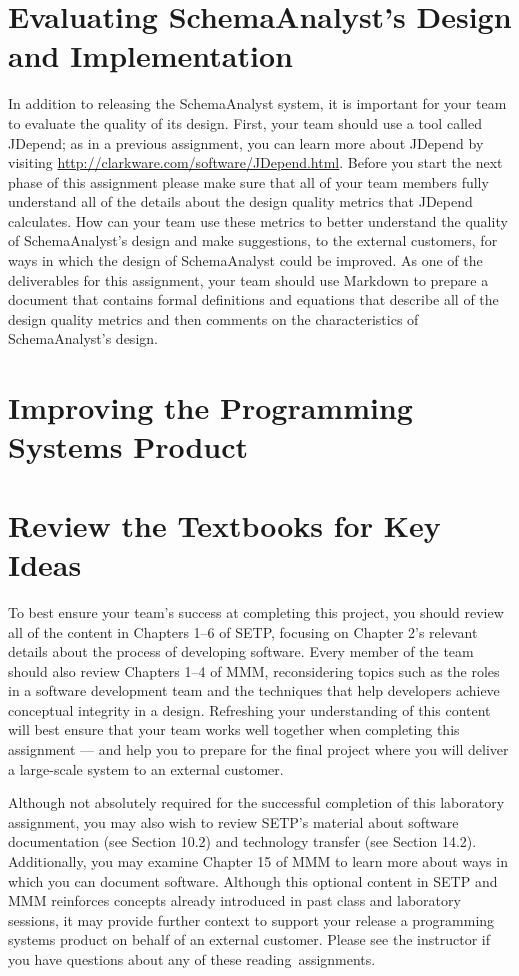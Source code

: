 \section*{Evaluating SchemaAnalyst's Design and Implementation}

In addition to releasing the SchemaAnalyst system, it is important for your team to evaluate the quality of its design.
First, your team should use a tool called JDepend; as in a previous assignment, you can learn more about JDepend by
visiting \url{http://clarkware.com/software/JDepend.html}.  Before you start the next phase of this assignment please
make sure that all of your team members fully understand all of the details about the design quality metrics that
JDepend calculates.  How can your team use these metrics to better understand the quality of SchemaAnalyst's design and
make suggestions, to the external customers, for ways in which the design of SchemaAnalyst could be improved. As one of
the deliverables for this assignment, your team should use Markdown to prepare a document that contains formal
definitions and equations that describe all of the design quality metrics and then comments on the characteristics of
SchemaAnalyst's design.



\section*{Improving the Programming Systems Product}

\section*{Review the Textbooks for Key Ideas}

To best ensure your team's success at completing this project, you should review all of the content in Chapters 1--6 of
SETP, focusing on Chapter 2's relevant details about the process of developing software. Every member of the team should
also review Chapters 1--4 of MMM, reconsidering topics such as the roles in a software development team and the
techniques that help developers achieve conceptual integrity in a design. Refreshing your understanding of this content
will best ensure that your team works well together when completing this assignment --- and help you to prepare for the
final project where you will deliver a large-scale system to an external customer.

Although not absolutely required for the successful completion of this laboratory assignment, you may also wish to
review SETP's material about software documentation (see Section 10.2) and technology transfer (see Section 14.2).
Additionally, you may examine Chapter 15 of MMM to learn more about ways in which you can document software. Although
this optional content in SETP and MMM reinforces concepts already introduced in past class and laboratory sessions, it
may provide further context to support your release a programming systems product on behalf of an external customer.
Please see the instructor if you have questions about any of these \mbox{reading assignments}.

